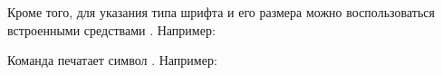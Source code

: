 Кроме того, для указания типа шрифта и его размера можно воспользоваться встроенными
средствами \XeLaTeX{}. Например:

\begin{pcbdoccode}
\end{pcbdoccode}

Команда  печатает символ . Например:

\begin{pcbdoccode}
\end{pcbdoccode}
